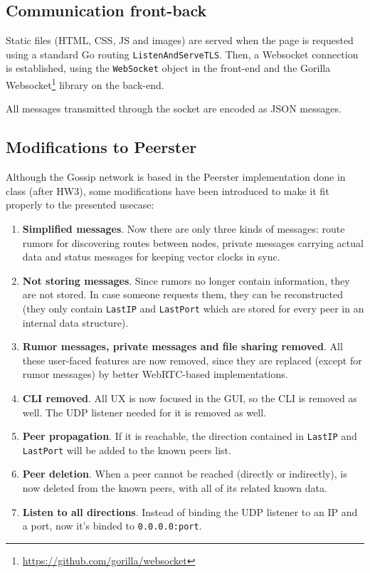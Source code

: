 \documentclass[paper=a4, fontsize=11pt]{scrartcl} %
\numberwithin{equation}{section} %
\numberwithin{figure}{section} %
\numberwithin{table}{section} %
\begin{document}
\subsection{Communication front-back}

Static files (HTML, CSS, JS and images) are served when the page is requested using a standard Go routing \verb|ListenAndServeTLS|. Then, a Websocket connection is established, using the \verb|WebSocket| object in the front-end and the Gorilla Websocket\footnote{\url{https://github.com/gorilla/websocket}} library on the back-end. 

All messages transmitted through the socket are encoded as JSON messages.

\subsection{Modifications to Peerster}

Although the Gossip network is based in the Peerster implementation done in class (after HW3), some modifications have been introduced to make it fit properly to the presented usecase:

\begin{enumerate}
	\item \textbf{Simplified messages}. Now there are only three kinds of messages: route rumors for discovering routes between nodes, private messages carrying actual data and status messages for keeping vector clocks in sync.
	\item \textbf{Not storing messages}. Since rumors no longer contain information, they are not stored. In case someone requests them, they can be reconstructed (they only contain \verb|LastIP| and \verb|LastPort| which are stored for every peer in an internal data structure).
	\item \textbf{Rumor messages, private messages and file sharing removed}. All these user-faced features are now removed, since they are replaced (except for rumor messages) by better WebRTC-based implementations.
	\item \textbf{CLI removed}. All UX is now focused in the GUI, so the CLI is removed as well. The UDP listener needed for it is removed as well.
	\item \textbf{Peer propagation}. If it is reachable, the direction contained in \verb|LastIP| and \verb|LastPort| will be added to the known peers list.
	\item \textbf{Peer deletion}. When a peer cannot be reached (directly or indirectly), is now deleted from the known peers, with all of its related known data.
	\item \textbf{Listen to all directions}. Instead of binding the UDP listener to an IP and a port, now it's binded to \verb|0.0.0.0:port|.
\end{enumerate}
\end{document}
